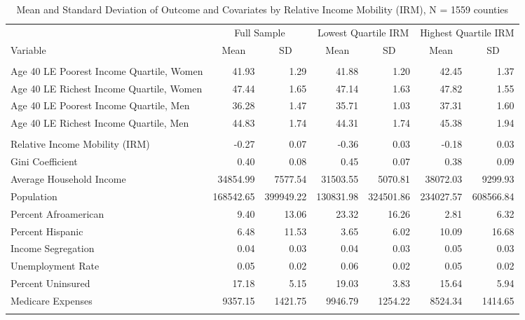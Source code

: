 \begin{table}[htp]
\centering
\caption{Mean and Standard Deviation of Outcome and Covariates
                 \newline by Relative Income Mobility (IRM), N = 1559 counties} 
\label{tab:descriptives}
\begingroup\scriptsize
\begin{tabular}{lrrrrrr}
  \hline
\addlinespace
& \multicolumn{2}{c}{Full Sample} & \multicolumn{2}{c}{Lowest Quartile IRM} & \multicolumn{2}{c}{Highest Quartile IRM}  \\
Variable & \multicolumn{1}{c}{Mean} & \multicolumn{1}{c}{SD} & \multicolumn{1}{c}{Mean} & \multicolumn{1}{c}{SD} & \multicolumn{1}{c}{Mean} & \multicolumn{1}{c}{SD} \\
\addlinespace
 \hline
  \addlinespace
\multicolumn{7}{l}{\textit{Outcome}} \\
\addlinespace
Age 40 LE Poorest Income Quartile, Women & 41.93 & 1.29 & 41.88 & 1.20 & 42.45 & 1.37 \\ 
  Age 40 LE Richest Income Quartile, Women & 47.44 & 1.65 & 47.14 & 1.63 & 47.82 & 1.55 \\ 
  Age 40 LE Poorest Income Quartile, Men & 36.28 & 1.47 & 35.71 & 1.03 & 37.31 & 1.60 \\ 
  Age 40 LE Richest Income Quartile, Men & 44.83 & 1.74 & 44.31 & 1.74 & 45.38 & 1.94 \\ 
   \addlinespace
\multicolumn{7}{l}{\textit{Covariates}} \\
\addlinespace
Relative Income Mobility (IRM) & -0.27 & 0.07 & -0.36 & 0.03 & -0.18 & 0.03 \\ 
  Gini Coefficient & 0.40 & 0.08 & 0.45 & 0.07 & 0.38 & 0.09 \\ 
  Average Household Income & 34854.99 & 7577.54 & 31503.55 & 5070.81 & 38072.03 & 9299.93 \\ 
  Population & 168542.65 & 399949.22 & 130831.98 & 324501.86 & 234027.57 & 608566.84 \\ 
  Percent Afroamerican & 9.40 & 13.06 & 23.32 & 16.26 & 2.81 & 6.32 \\ 
  Percent Hispanic & 6.48 & 11.53 & 3.65 & 6.02 & 10.09 & 16.68 \\ 
  Income Segregation & 0.04 & 0.03 & 0.04 & 0.03 & 0.05 & 0.03 \\ 
  Unemployment Rate & 0.05 & 0.02 & 0.06 & 0.02 & 0.05 & 0.02 \\ 
  Percent Uninsured & 17.18 & 5.15 & 19.03 & 3.83 & 15.64 & 5.94 \\ 
  Medicare Expenses & 9357.15 & 1421.75 & 9946.79 & 1254.22 & 8524.34 & 1414.65 \\ 
   \addlinespace
\hline
\addlinespace
\end{tabular}
\endgroup
\end{table}
